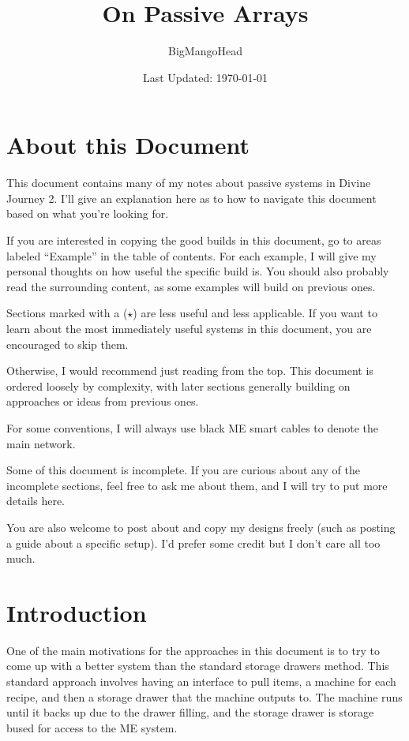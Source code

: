 \documentclass{notes}
\title{On Passive Arrays}
\author{BigMangoHead}
\date{Last Updated: \today}
\begin{document}
\maketitle

\section{About this Document}
This document contains many of my notes about passive systems in Divine Journey 2. I'll give an explanation here as to how to navigate this document based on what you're looking for.

\medskip

If you are interested in copying the good builds in this document, go to areas labeled ``Example'' in the table of contents. For each example, I will give my personal thoughts on how useful the specific build is. You should also probably read the surrounding content, as some examples will build on previous ones.

\medskip

Sections marked with a ($\star$) are less useful and less applicable. If you want to learn about the most immediately useful systems in this document, you are encouraged to skip them.

\medskip

Otherwise, I would recommend just reading from the top. This document is ordered loosely by complexity, with later sections generally building on approaches or ideas from previous ones.

\medskip

For some conventions, I will always use black ME smart cables to denote the main network.

\medskip

Some of this document is incomplete. If you are curious about any of the incomplete sections, feel free to ask me about them, and I will try to put more details here.

\medskip

You are also welcome to post about and copy my designs freely (such as posting a guide about a specific setup). I'd prefer some credit but I don't care all too much.

\pagebreak
\tableofcontents
\pagebreak

\section{Introduction}
One of the main motivations for the approaches in this document is to try to come up with a better system than the standard storage drawers method. This standard approach involves having an interface to pull items, a machine for each recipe, and then a storage drawer that the machine outputs to. The machine runs until it backs up due to the drawer filling, and the storage drawer is storage bused for access to the ME system. 
\end{document}
